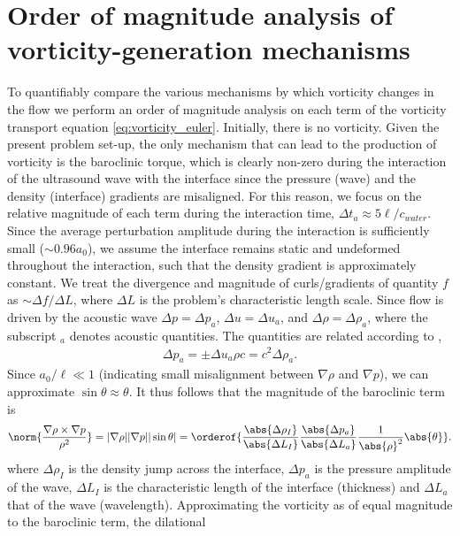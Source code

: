 \section{Order of magnitude analysis of vorticity-generation mechanisms}
\label{sec:oom_analysis}
To quantifiably compare the various mechanisms by which vorticity
changes in the flow we perform an order of magnitude analysis on each
term of the vorticity transport equation
\eqref{eq:vorticity_euler}. Initially, there is no vorticity. Given
the present problem set-up, the only mechanism that can lead to the
production of vorticity is the baroclinic torque, which is clearly
non-zero during the interaction of the ultrasound wave with the
interface since the pressure (wave) and the density (interface)
gradients are misaligned. For this reason, we focus on the relative
magnitude of each term during the interaction time, $\Delta t_a
\approx 5\ell/c_{water}$. Since the average perturbation amplitude
during the interaction is sufficiently small ($\sim 0.96a_0$), we
assume the interface remains static and undeformed throughout the
interaction, such that the density gradient is approximately
constant. We treat the divergence and magnitude of curls/gradients of
quantity $f$ as $\sim \Delta f/ \Delta L$, where $\Delta L$ is the
problem's characteristic length scale. Since flow is driven by the
acoustic wave $\Delta p=\Delta p_a$, $\Delta u=\Delta u_a$, and
$\Delta \rho=\Delta \rho_a$, where the subscript $_a$ denotes acoustic
quantities. The quantities are related according to
\citep{Anderson1990},
\begin{align}%
  \label{eq:acoustic_relations}%
  \Delta p_a=\pm\Delta u_a \rho c=c^2\Delta \rho_a.%
\end{align}
Since $a_0/\ell\ll 1$ (indicating small misalignment between
$\nabla \rho$ and $\nabla p$), we can approximate
$\sin \theta \approx \theta$. It thus follows that the magnitude of the
baroclinic term is
\begin{align}
  \label{eq:baroclinic_vorticity}%
  \norm{\frac{\nabla\rho\times\nabla p}{\rho^2}} =%
  |\nabla \rho||\nabla p||\sin\theta|=
  \orderof{\frac{\abs{\Delta \rho_I}}{\abs{\Delta L_I}}\frac{\abs{\Delta p_a}}{\abs{\Delta L_a}}\frac{1}{\abs{\rho}^2}\abs{\theta}}.%
\end{align}
where $\Delta \rho_I$ is the density jump across the interface,
$\Delta p_a$ is the pressure amplitude of the wave, $\Delta L_I$ is
the characteristic length of the interface (thickness) and
$\Delta L_a$ that of the wave (wavelength). Approximating the
vorticity as of equal magnitude to the baroclinic term, the dilational
